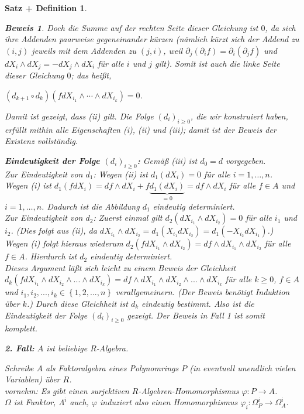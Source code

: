 \documentclass[a4paper,12pt]{scrbook}
\theoremstyle{break}
\newtheorem{SatzDef}[Satz]{Satz + Definition}
\theoremstyle{nonumberbreak}
\newtheorem{Bew}{Beweis}
\theoremstyle{nonumberplain}
\begin{document}
\begin{SatzDef}
\begin{Bew}
Doch die Summe auf der rechten Seite dieser Gleichung ist $0$, da sich ihre Addenden paarweise gegeneinander kürzen (nämlich kürzt sich der Addend zu $\left(i,j\right)$ jeweils mit dem Addenden zu $\left(j,i\right)$, weil $\partial_j(\partial_i f) = \partial_i(\partial_j f)$ und $dX_i\wedge dX_j=-dX_j\wedge dX_i$ für alle $i$ und $j$ gilt). Somit ist auch die linke Seite dieser Gleichung $0$; das heißt,

$\left(d_{k+1}\circ d_k\right)\left(fdX_{i_1}\wedge \cdots \wedge dX_{i_k}\right) = 0$.

Damit ist gezeigt, dass (ii) gilt. Die Folge $\left(d_i\right)_{i\geq 0}$, die wir konstruiert haben, erfüllt mithin alle Eigenschaften (i), (ii) und (iii); damit ist der Beweis der Existenz vollständig.

\textbf{Eindeutigkeit der Folge $\left(d_i\right)_{i\geq 0}$:} Gemäß (iii) ist $d_0=d$ vorgegeben.\\

Zur Eindeutigkeit von $d_1$: Wegen (ii) ist $d_1(dX_i)=0$ für alle $i=1, \ldots, n$.\\
Wegen (i) ist $d_1(fdX_i)=df\wedge dX_i+f\underbrace{d_1(dX_i)}_{=0} = df \wedge dX_i$ für alle $f\in A$ und $i=1,\ldots ,n$. Dadurch ist die Abbildung $d_1$ eindeutig determiniert. \\

Zur Eindeutigkeit von $d_2$: Zuerst einmal gilt $d_2(dX_{i_1}\wedge dX_{i_2})=0$ für alle $i_1$ und $i_2$. (Dies folgt aus (ii), da $dX_{i_1}\wedge dX_{i_2}=d_1(X_{i_1} dX_{i_2})=d_1(-X_{i_2}dX_{i_1})$.)\\
Wegen (i) folgt hieraus wiederum $d_2(fdX_{i_1}\wedge dX_{i_2})=df\wedge dX_{i_1}\wedge dX_{i_2}$ für alle $f\in A$. Hierdurch ist $d_2$ eindeutig determiniert.\\

Dieses Argument läßt sich leicht zu einem Beweis der Gleichheit
$d_k\left(f dX_{i_1} \wedge dX_{i_2} \wedge ... \wedge dX_{i_k}\right) = df \wedge dX_{i_1} \wedge dX_{i_2} \wedge ... \wedge dX_{i_k}$
für alle $k\geq 0$, $f\in A$ und $i_1,i_2,...,i_k\in\left\{1,2,...,n\right\}$ verallgemeinern. (Der Beweis benötigt Induktion über $k$.) Durch diese Gleichheit ist $d_k$ eindeutig bestimmt. Also ist die Eindeutigkeit der Folge $\left(d_i\right)_{i\geq 0}$ gezeigt. Der Beweis in Fall 1 ist somit komplett.

\textbf{2. Fall:} $A$ ist beliebige $R$-Algebra.

Schreibe $A$ als Faktoralgebra eines Polynomrings $P$ (in eventuell unendlich vielen Variablen) über $R$.\\
vornehm: Es gibt einen surjektiven $R$-Algebren-Homomorphismus $\varphi:P\to A$.\\
$\Omega$ ist Funktor, $\Lambda^i$ auch, $\varphi$ induziert also einen Homomorphismus 
$\varphi_i: \Omega_P^{i}\to \Omega_A^{i}$.


\end{Bew}
\end{SatzDef}
\end{document}
